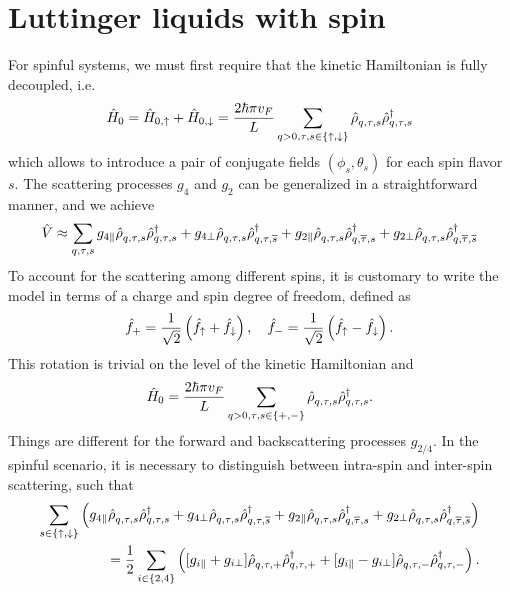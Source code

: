 \section{Luttinger liquids with spin}
\label{sec:LL_with_spin}
For spinful systems, we must first require that the kinetic Hamiltonian is fully decoupled, i.e.
\begin{align}
    \hat H_0 = \hat H_{0,\uparrow}+\hat H_{0,\downarrow}
    = \frac{2\hbar\pi v_F}L\sum_{q>0,\tau,s\in\{\uparrow,\downarrow\}}\hat\rho^\pdag_{q,\tau,s}\hat\rho^\dag_{q,\tau,s}
\end{align}
which allows to introduce a pair of conjugate fields $(\phi_s,\theta_s)$ for each spin flavor $s$.
The scattering processes $g_4$ and $g_2$ can be generalized in a straightforward manner, and we achieve
\begin{align}
  \hat V \approx
  \sum_{q,\tau,s}
  g_{4\parallel}\hat\rho^\pdag_{q,\tau,s}\hat\rho^\dag_{q,\tau,s}
  +
  g_{4\perp}\hat\rho^\pdag_{q,\tau,s}\hat\rho^\dag_{q,\tau,\overline s}
  +
  g_{2\parallel}\hat\rho^\pdag_{q,\tau,s}\hat\rho^\dag_{q,\overline\tau,s}
  +
  g_{2\perp}\hat\rho^\pdag_{q,\tau,s}\hat\rho^\dag_{q,\overline\tau,\overline s}
\end{align}
To account for the scattering among different spins, it is customary to write the model in terms of a charge and spin degree of freedom, defined as
\begin{align}
    \hat f_+=\frac1{\sqrt2}\left( \hat f_\uparrow + \hat f_\downarrow \right),
    \quad
    \hat f_-=\frac1{\sqrt2}\left( \hat f_\uparrow - \hat f_\downarrow \right).
\end{align}
This rotation is trivial on the level of the kinetic Hamiltonian and
\begin{align}
    \hat H_0 = \frac{2\hbar\pi v_F}L\sum_{q>0,\tau,s\in\{+,-\}}\hat\rho^\pdag_{q,\tau,s}\hat\rho^\dag_{q,\tau,s}.
\end{align}
Things are different for the forward and backscattering processes $g_{2/4}$.
In the spinful scenario, it is necessary to distinguish between intra-spin and inter-spin scattering, such that
\begin{align}
  \sum_{s\in\{\uparrow,\downarrow\}}
  \brlr{
  g_{4\parallel}\hat\rho^\pdag_{q,\tau,s}\hat\rho^\dag_{q,\tau,s}
  +
  g_{4\perp}\hat\rho^\pdag_{q,\tau,s}\hat\rho^\dag_{q,\tau,\overline s}
  +
  g_{2\parallel}\hat\rho^\pdag_{q,\tau,s}\hat\rho^\dag_{q,\overline\tau,s}
  +
  g_{2\perp}\hat\rho^\pdag_{q,\tau,s}\hat\rho^\dag_{q,\overline\tau,\overline s}
  }
  \\
  =
  \frac12
  \sum_{i\in\{2,4\}}
  \brlr{
  [g_{i\parallel}+g_{i\perp}]\hat\rho^\pdag_{q,\tau,+}\hat\rho^\dag_{q,\tau,+}
  +
  [g_{i\parallel}-g_{i\perp}]\hat\rho^\pdag_{q,\tau,-}\hat\rho^\dag_{q,\tau,-}
  }.
\end{align}
